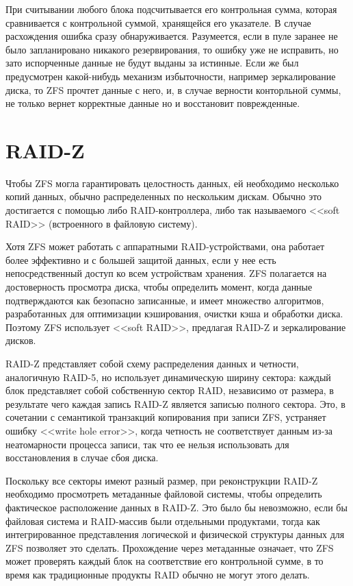 \documentclass[a4page]{article}
\begin{document}
При считывании любого блока подсчитывается его контрольная сумма,
которая сравнивается с контрольной суммой, хранящейся его указателе.
В случае расхождения ошибка сразу обнаруживается.
Разумеется, если в пуле заранее не было запланировано никакого резервирования, то ошибку уже не исправить, но зато испорченные данные не будут выданы за истинные.
Если же был предусмотрен какой-нибудь механизм избыточности, например зеркалирование диска,
то ZFS прочтет данные с него, и, в случае верности конторльной суммы,
не только вернет корректные данные но и восстановит поврежденные.

\section{RAID-Z}

Чтобы ZFS могла гарантировать целостность данных, ей необходимо несколько копий данных,
обычно распределенных по нескольким дискам.
Обычно это достигается с помощью либо RAID-контроллера,
либо так называемого <<soft RAID>> (встроенного в файловую систему).

Хотя ZFS может работать с аппаратными RAID-устройствами,
она работает более эффективно и с большей защитой данных,
если у нее есть непосредственный доступ ко всем устройствам хранения.
ZFS полагается на достоверность просмотра диска, чтобы определить момент,
когда данные подтверждаются как безопасно записанные, и имеет множество алгоритмов,
разработанных для оптимизации кэширования, очистки кэша и обработки диска.
Поэтому ZFS использует <<soft RAID>>, предлагая RAID-Z и зеркалирование дисков.

RAID-Z представляет собой схему распределения данных и четности, аналогичную RAID-5,
но использует динамическую ширину сектора: каждый блок представляет собой собственную сектор RAID,
независимо от размера, в результате чего каждая запись RAID-Z является записью полного сектора.
Это, в сочетании с семантикой транзакций копирования при записи ZFS, устраняет ошибку <<write hole error>>,
когда четность не соответствует данным из-за неатомарности процесса записи,
так что ее нельзя использовать для восстановления в случае сбоя диска.

Поскольку все секторы имеют разный размер,
при реконструкции RAID-Z необходимо просмотреть метаданные файловой системы,
чтобы определить фактическое расположение данных в RAID-Z.
Это было бы невозможно, если бы файловая система и RAID-массив были отдельными продуктами,
тогда как интегрированное представления логической и физической структуры данных для ZFS позволяет это сделать.
Прохождение через метаданные означает,
что ZFS может проверять каждый блок на соответствие его контрольной сумме,
в то время как традиционные продукты RAID обычно не могут этого делать.
\end{document}
